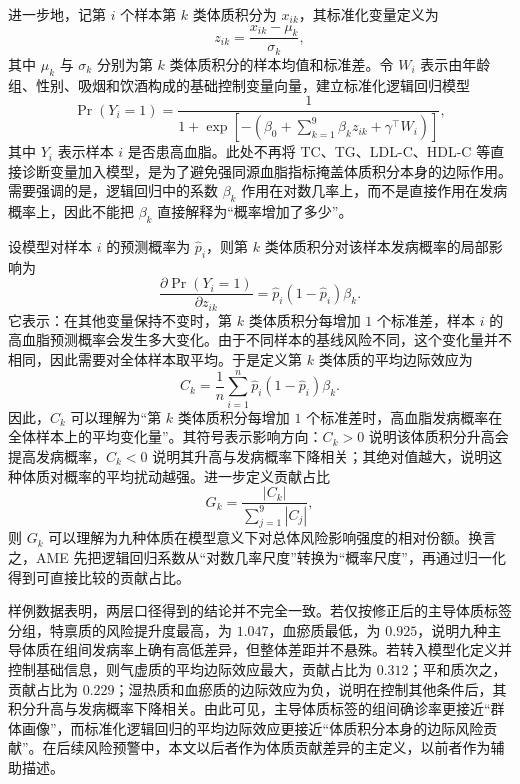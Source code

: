 \documentclass{MathorCupmodeling}
\begin{document}
		进一步地，记第 $i$ 个样本第 $k$ 类体质积分为 $x_{ik}$，其标准化变量定义为
		\begin{equation}
			z_{ik}=\frac{x_{ik}-\mu_k}{\sigma_k},
		\end{equation}
		其中 $\mu_k$ 与 $\sigma_k$ 分别为第 $k$ 类体质积分的样本均值和标准差。令 $W_i$ 表示由年龄组、性别、吸烟和饮酒构成的基础控制变量向量，建立标准化逻辑回归模型
		\begin{equation}
			\Pr(Y_i=1)=\frac{1}{1+\exp\left[-\left(\beta_0+\sum_{k=1}^{9}\beta_k z_{ik}+\gamma^\top W_i\right)\right]},
		\end{equation}
			其中 $Y_i$ 表示样本 $i$ 是否患高血脂。此处不再将 TC、TG、LDL-C、HDL-C 等直接诊断变量加入模型，是为了避免强同源血脂指标掩盖体质积分本身的边际作用。需要强调的是，逻辑回归中的系数 $\beta_k$ 作用在对数几率上，而不是直接作用在发病概率上，因此不能把 $\beta_k$ 直接解释为“概率增加了多少”。

			设模型对样本 $i$ 的预测概率为 $\hat{p}_i$，则第 $k$ 类体质积分对该样本发病概率的局部影响为
			\begin{equation}
				\frac{\partial \Pr(Y_i=1)}{\partial z_{ik}}=\hat{p}_i(1-\hat{p}_i)\beta_k.
			\end{equation}
			它表示：在其他变量保持不变时，第 $k$ 类体质积分每增加 $1$ 个标准差，样本 $i$ 的高血脂预测概率会发生多大变化。由于不同样本的基线风险不同，这个变化量并不相同，因此需要对全体样本取平均。于是定义第 $k$ 类体质的平均边际效应为
			\begin{equation}
				C_k=\frac{1}{n}\sum_{i=1}^{n}\hat{p}_i(1-\hat{p}_i)\beta_k.
			\end{equation}
			因此，$C_k$ 可以理解为“第 $k$ 类体质积分每增加 $1$ 个标准差时，高血脂发病概率在全体样本上的平均变化量”。其符号表示影响方向：$C_k>0$ 说明该体质积分升高会提高发病概率，$C_k<0$ 说明其升高与发病概率下降相关；其绝对值越大，说明这种体质对概率的平均扰动越强。进一步定义贡献占比
			\begin{equation}
				G_k=\frac{|C_k|}{\sum_{j=1}^{9}|C_j|},
			\end{equation}
			则 $G_k$ 可以理解为九种体质在模型意义下对总体风险影响强度的相对份额。换言之，AME 先把逻辑回归系数从“对数几率尺度”转换为“概率尺度”，再通过归一化得到可直接比较的贡献占比。

		样例数据表明，两层口径得到的结论并不完全一致。若仅按修正后的主导体质标签分组，特禀质的风险提升度最高，为 $1.047$，血瘀质最低，为 $0.925$，说明九种主导体质在组间发病率上确有高低差异，但整体差距并不悬殊。若转入模型化定义并控制基础信息，则气虚质的平均边际效应最大，贡献占比为 $0.312$；平和质次之，贡献占比为 $0.229$；湿热质和血瘀质的边际效应为负，说明在控制其他条件后，其积分升高与发病概率下降相关。由此可见，主导体质标签的组间确诊率更接近“群体画像”，而标准化逻辑回归的平均边际效应更接近“体质积分本身的边际风险贡献”。在后续风险预警中，本文以后者作为体质贡献差异的主定义，以前者作为辅助描述。
\end{document}
